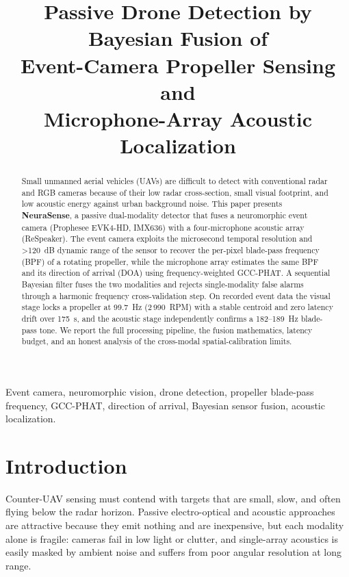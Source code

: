 \documentclass[conference]{IEEEtran}
\begin{document}
\title{Passive Drone Detection by Bayesian Fusion of\\
Event-Camera Propeller Sensing and\\
Microphone-Array Acoustic Localization}

\author{
}

\maketitle

\begin{abstract}
Small unmanned aerial vehicles (UAVs) are difficult to detect with
conventional radar and RGB cameras because of their low radar cross-section,
small visual footprint, and low acoustic energy against urban background
noise. This paper presents \textbf{NeuraSense}, a passive dual-modality
detector that fuses a neuromorphic event camera (Prophesee EVK4-HD, IMX636)
with a four-microphone acoustic array (ReSpeaker). The event camera exploits
the microsecond temporal resolution and \textgreater120~dB dynamic range of
the sensor to recover the per-pixel blade-pass frequency (BPF) of a rotating
propeller, while the microphone array estimates the same BPF and its
direction of arrival (DOA) using frequency-weighted GCC-PHAT. A sequential
Bayesian filter fuses the two modalities and rejects single-modality false
alarms through a harmonic frequency cross-validation step. On recorded event
data the visual stage locks a propeller at 99.7~Hz (2\,990~RPM) with a stable
centroid and zero latency drift over 175~s, and the acoustic stage
independently confirms a 182--189~Hz blade-pass tone. We report the full
processing pipeline, the fusion mathematics, latency budget, and an honest
analysis of the cross-modal spatial-calibration limits.
\end{abstract}

\begin{IEEEkeywords}
Event camera, neuromorphic vision, drone detection, propeller blade-pass
frequency, GCC-PHAT, direction of arrival, Bayesian sensor fusion, acoustic
localization.
\end{IEEEkeywords}

\section{Introduction}
Counter-UAV sensing must contend with targets that are small, slow, and often
flying below the radar horizon. Passive electro-optical and acoustic
approaches are attractive because they emit nothing and are inexpensive, but
each modality alone is fragile: cameras fail in low light or clutter, and
single-array acoustics is easily masked by ambient noise and suffers from poor
angular resolution at long range.
\end{document}

